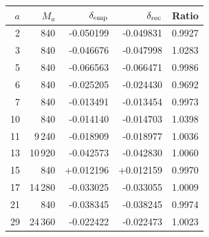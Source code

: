 \begin{tabular}{rrrrr}
\toprule $a$ & $M_a$ & $\delta_{\rm emp}$ & $\delta_{\rm rec}$ & Ratio\\\midrule
2 & 840 & -0.050199 & -0.049831 & 0.9927\\
3 & 840 & -0.046676 & -0.047998 & 1.0283\\
5 & 840 & -0.066563 & -0.066471 & 0.9986\\
6 & 840 & -0.025205 & -0.024430 & 0.9692\\
7 & 840 & -0.013491 & -0.013454 & 0.9973\\
10 & 840 & -0.014140 & -0.014703 & 1.0398\\
11 & 9\,240 & -0.018909 & -0.018977 & 1.0036\\
13 & 10\,920 & -0.042573 & -0.042830 & 1.0060\\
15 & 840 & +0.012196 & +0.012159 & 0.9970\\
17 & 14\,280 & -0.033025 & -0.033055 & 1.0009\\
21 & 840 & -0.038345 & -0.038245 & 0.9974\\
29 & 24\,360 & -0.022422 & -0.022473 & 1.0023\\
\bottomrule
\end{tabular}
